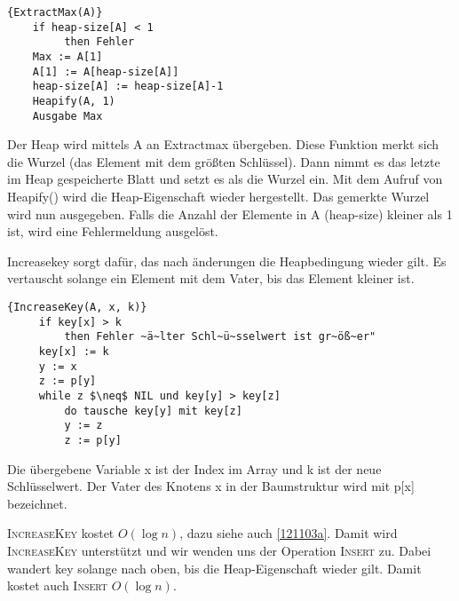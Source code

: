 \begin{Algorithmus}[ht]
\begin{lstlisting}[frame=tlrb, mathescape=true, title=\textsc{ExtractMax\textnormal{(A)}}, gobble=4]{ExtractMax(A)}
    if heap-size[A] < 1
         then Fehler
    Max := A[1]
    A[1] := A[heap-size[A]]
    heap-size[A] := heap-size[A]-1
    Heapify(A, 1)
    Ausgabe Max
\end{lstlisting}

Der Heap wird mittels A an Extractmax übergeben. Diese Funktion merkt sich die Wurzel (das Element mit dem größten Schlüssel).
Dann nimmt es das letzte im Heap gespeicherte Blatt und setzt es als die Wurzel ein. Mit dem Aufruf von Heapify() wird die
Heap-Eigenschaft wieder hergestellt. Das gemerkte Wurzel wird nun ausgegeben.
Falls die Anzahl der Elemente in A (heap-size) kleiner als 1 ist, wird eine Fehlermeldung ausgelöst.
\end{Algorithmus}

Increasekey sorgt dafür, das nach änderungen die Heapbedingung wieder gilt. Es vertauscht solange ein Element mit dem Vater, bis
das Element kleiner ist.

\begin{Algorithmus}[ht]
\begin{lstlisting}[frame=tlrb, mathescape=true, title=\textsc{IncreaseKey\textnormal{(A, x, k)}}, gobble=4]{IncreaseKey(A, x, k)}
     if key[x] > k
         then Fehler ~ä~lter Schl~ü~sselwert ist gr~öß~er"    
     key[x] := k
     y := x
     z := p[y]
     while z $\neq$ NIL und key[y] > key[z]
         do tausche key[y] mit key[z]
         y := z
         z := p[y]
\end{lstlisting}

Die übergebene Variable x ist der Index im Array und k ist der neue Schlüsselwert. Der Vater des Knotens x in
der Baumstruktur wird mit p[x] bezeichnet.
\end{Algorithmus}
\textsc{IncreaseKey} kostet $O(\log n)$, dazu siehe auch \autoref{121103a}.
Damit wird \textsc{IncreaseKey} unterstützt und wir wenden uns der Operation \textsc{Insert} zu.
Dabei wandert key solange nach oben, bis die Heap-Eigenschaft wieder gilt. Damit kostet auch \textsc{Insert} $O(\log n)$.


